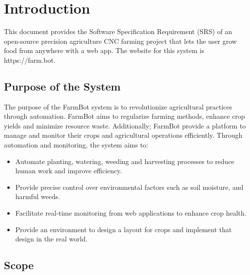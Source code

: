 
\chapter{Introduction} \label{introduction}

This document provides the Software Specification Requirement (SRS) of an open-source precision agriculture CNC farming project that lets the user grow food from anywhere with a web app. The website for this system is https://farm.bot.

\section{Purpose of the System }

The purpose of the FarmBot system is to revolutionize agricultural practices through automation. FarmBot aims to regularize farming methods, enhance crop yields and minimize resource waste. Additionally; FarmBot provide a platform to manage and monitor their crops and agricultural operations efficiently. Through automation and monitoring, the system aims to:

\begin{itemize}
    \item Automate planting, watering, weeding and harvesting processes to reduce human work and improve efficiency.
    \item Provide precise control over environmental factors such as soil moisture, and harmful weeds.
    \item Facilitate real-time monitoring from web applications to enhance crop health.
    \item Provide an environment to design a layout for crops and implement that design in the real world.
\end{itemize}

\section{Scope}

